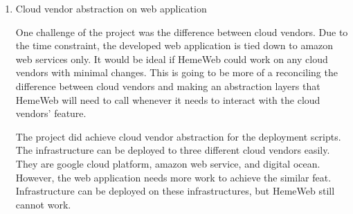 \begin{enumerate}
	\item Cloud vendor abstraction on web application
	
	One challenge of the project was the difference between cloud vendors. Due to the time constraint, the developed web application is tied down to amazon web services only. It would be ideal if HemeWeb could work on any cloud vendors with minimal changes. This is going to be more of a reconciling the difference between cloud vendors and making an abstraction layers that HemeWeb will need to call whenever it needs to interact with the cloud vendors' feature.
	
	The project did achieve cloud vendor abstraction for the deployment scripts. The infrastructure can be deployed to three different cloud vendors easily. They are google cloud platform, amazon web service, and digital ocean. However, the web application needs more work to achieve the similar feat. Infrastructure can be deployed on these infrastructures, but HemeWeb still cannot work.
	
\end{enumerate}

